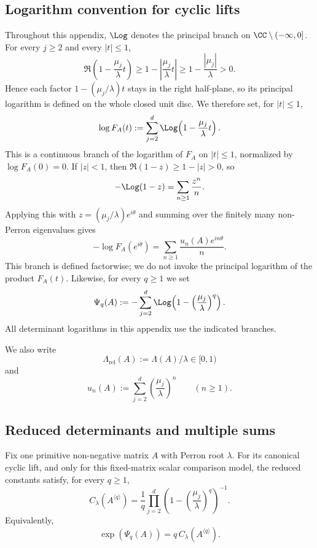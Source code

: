 \subsection{Logarithm convention for cyclic lifts}

Throughout this appendix, \(\Log\) denotes the principal branch on
\(\CC\setminus(-\infty,0]\). For every \(j\ge 2\) and every \(|t|\le 1\),
\[
  \Re\!\left(1-\frac{\mu_j}{\lambda}t\right)
  \ge 1-\left|\frac{\mu_j}{\lambda}t\right|
  \ge 1-\frac{|\mu_j|}{\lambda}
  >0.
\]
Hence each factor \(1-(\mu_j/\lambda)t\) stays in the right half-plane,
so its principal logarithm is defined on the whole closed unit disc. We
therefore set, for \(|t|\le 1\),
\[
  \log F_A(t)
  :=
  \sum_{j=2}^d \Log\!\left(1-\frac{\mu_j}{\lambda}t\right).
\]
This is a continuous branch of the logarithm of \(F_A\) on \(|t|\le 1\),
normalized by \(\log F_A(0)=0\). If \(|z|<1\), then
\(\Re(1-z)\ge 1-|z|>0\), so
\[
  -\Log(1-z)=\sum_{n\ge 1}\frac{z^n}{n}.
\]
Applying this with \(z=(\mu_j/\lambda)e^{i\theta}\) and summing over the
finitely many non-Perron eigenvalues gives
\[
  -\log F_A(e^{i\theta})
  =
  \sum_{n\ge 1}\frac{u_n(A)e^{in\theta}}{n}.
\]
This branch is defined factorwise; we do not invoke the principal
logarithm of the product \(F_A(t)\). Likewise, for every \(q\ge 1\) we
set
\[
  \Psi_q(A)
  :=
  -\sum_{j=2}^d
    \Log\!\left(1-\left(\frac{\mu_j}{\lambda}\right)^q\right).
\]
All determinant logarithms in this appendix use the indicated branches.

We also write
\[
  \Lambda_{\mathrm{rel}}(A):=\Lambda(A)/\lambda\in[0,1)
\]
and
\[
  u_n(A):=\sum_{j=2}^d\left(\frac{\mu_j}{\lambda}\right)^n
  \qquad (n\ge 1).
\]

\subsection{Reduced determinants and multiple sums}

\begin{proposition}
  \label{prop:finite-part-cyclic-lift-reduced-constant-closed}
  Fix one primitive non-negative matrix \(A\) with Perron root \(\lambda\).
  For its canonical cyclic lift, and only for this fixed-matrix scalar
  comparison model, the reduced constants satisfy, for every \(q\ge 1\),
  \[
    C_\lambda(A^{\langle q\rangle})
    =\frac{1}{q}\prod_{j=2}^d
      \left(1-\left(\frac{\mu_j}{\lambda}\right)^q\right)^{-1}.
  \]
  Equivalently,
  \[
    \exp(\Psi_q(A))
    =
    q\,C_\lambda(A^{\langle q\rangle}).
  \]
\end{proposition}

